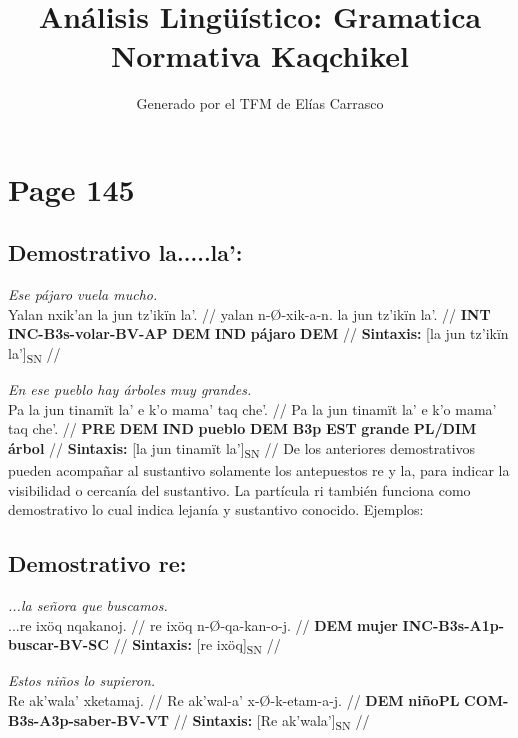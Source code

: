 \documentclass{article}%
\title{Análisis Lingüístico: Gramatica Normativa Kaqchikel}%
\author{Generado por el TFM de Elías Carrasco}%
\begin{document}
%
\normalsize%
\maketitle%
\section{Page 145}%
\label{sec:Page145}%
\subsection{Demostrativo la.....la':}%
\label{subsec:Demostrativola.....la}%

%
\par\medskip%
\ex
\textit{Ese pájaro vuela mucho.} \\
\begingl
\gla Yalan nxik'an la jun tz'ikïn la'. //
\glb yalan n-Ø-xik-a-n. la jun tz'ikïn la'. //
\glc \textbf{INT} \textbf{INC-}\textbf{B3s-}\textbf{volar-}\textbf{BV-}\textbf{AP} \textbf{DEM} \textbf{IND} \textbf{pájaro} \textbf{DEM} //
\glft \textbf{Sintaxis:} [la jun tz'ikïn la']\textsubscript{SN} //
\endgl
\xe
%
\medskip%
\par\medskip%
\ex
\textit{En ese pueblo hay árboles muy grandes.} \\
\begingl
\gla Pa la jun tinamït la' e k'o mama' taq che'. //
\glb Pa la jun tinamït la' e k'o mama' taq che'. //
\glc \textbf{PRE} \textbf{DEM} \textbf{IND} \textbf{pueblo} \textbf{DEM} \textbf{B3p} \textbf{EST} \textbf{grande} \textbf{PL/DIM} \textbf{árbol} //
\glft \textbf{Sintaxis:} [la jun tinamït la']\textsubscript{SN} //
\endgl
\xe
%
\medskip%
De los anteriores demostrativos pueden acompañar al sustantivo solamente los %
antepuestos re y la, para indicar la visibilidad o cercanía del sustantivo. La partícula ri %
también funciona como demostrativo lo cual indica lejanía y sustantivo conocido. %
Ejemplos: %
\subsection{Demostrativo re:}%
\label{subsec:Demostrativore}%

%
\par\medskip%
\ex
\textit{...la señora que buscamos.} \\
\begingl
\gla ...re ixöq nqakanoj. //
\glb re ixöq n-Ø-qa-kan-o-j. //
\glc \textbf{DEM} \textbf{mujer} \textbf{INC-}\textbf{B3s-}\textbf{A1p-}\textbf{buscar-}\textbf{BV-}\textbf{SC} //
\glft \textbf{Sintaxis:} [re ixöq]\textsubscript{SN} //
\endgl
\xe
%
\medskip%
\par\medskip%
\ex
\textit{Estos niños lo supieron.} \\
\begingl
\gla Re ak'wala' xketamaj. //
\glb Re ak'wal-a' x-Ø-k-etam-a-j. //
\glc \textbf{DEM} \textbf{niño}\textbf{PL} \textbf{COM-}\textbf{B3s-}\textbf{A3p-}\textbf{saber-}\textbf{BV-}\textbf{VT} //
\glft \textbf{Sintaxis:} [Re ak'wala']\textsubscript{SN} //
\endgl
\xe
%
\medskip%
\end{document}
